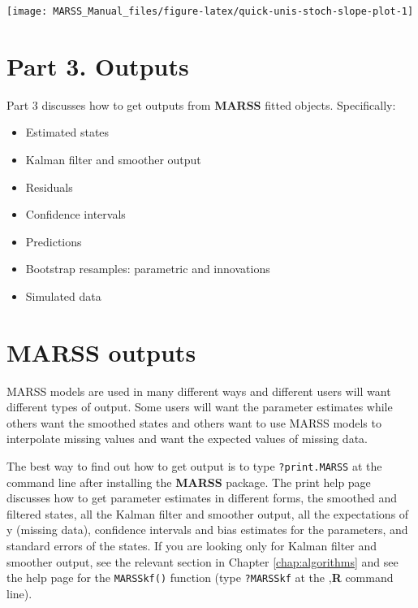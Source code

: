 \documentclass[12pt,]{book}
\providecommand{\tightlist}{%
  \setlength{\itemsep}{0pt}\setlength{\parskip}{0pt}}
\begin{document}
\begin{center}\texttt{[image: MARSS\_Manual\_files/figure-latex/quick-unis-stoch-slope-plot-1]} \end{center}

\hypertarget{part3}{%
\chapter*{Part 3. Outputs}\label{part3}}


Part 3 discusses how to get outputs from \textbf{MARSS} fitted objects. Specifically:

\begin{itemize}
\tightlist
\item
  Estimated states
\item
  Kalman filter and smoother output
\item
  Residuals
\item
  Confidence intervals
\item
  Predictions
\item
  Bootstrap resamples: parametric and innovations
\item
  Simulated data
\end{itemize}

\hypertarget{marss-outputs}{%
\chapter{MARSS outputs}\label{marss-outputs}}

MARSS models are used in many different ways and different users will want different types of output. Some users will want the parameter estimates while others want the smoothed states and others want to use MARSS models to interpolate missing values and want the expected values of missing data.

The best way to find out how to get output is to type \texttt{?print.MARSS} at the command line after installing the \textbf{MARSS} package. The print help page discusses how to get parameter estimates in different forms, the smoothed and filtered states, all the Kalman filter and smoother output, all the expectations of y (missing data), confidence intervals and bias estimates for the parameters,
and standard errors of the states. If you are looking only for Kalman filter and smoother output, see the relevant section in Chapter \ref{chap:algorithms} and see the help page for the \texttt{MARSSkf()} function (type \texttt{?MARSSkf} at the ,\textbf{R} command line).
\end{document}
